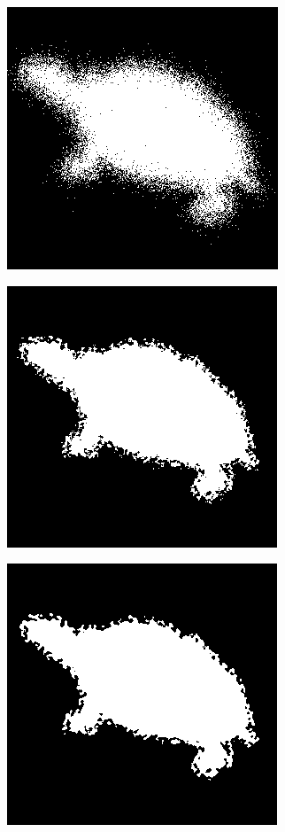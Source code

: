 \documentclass{article}
\theoremstyle{definition}
\begin{document}
     \begin{figure}[!h]
	\centering
	  \begin{subfigure}{.24\textwidth}
	    \centering
	    \includegraphics[scale=0.3]{Illustrations/turtle-1-bruit.png}
	    \label{butterfly-rempli}
	  \end{subfigure}
	  \begin{subfigure}{.24\textwidth}
	    \centering
	    \includegraphics[scale=0.3]{Illustrations/turtle-1-bruit1.png}
	    \label{spirale-rempli}
	  \end{subfigure}
	  \begin{subfigure}{.24\textwidth}
	    \centering
	    \includegraphics[scale=0.3]{Illustrations/turtle-1-bruit2.png}

\end{subfigure}
\end{figure}
\end{document}

